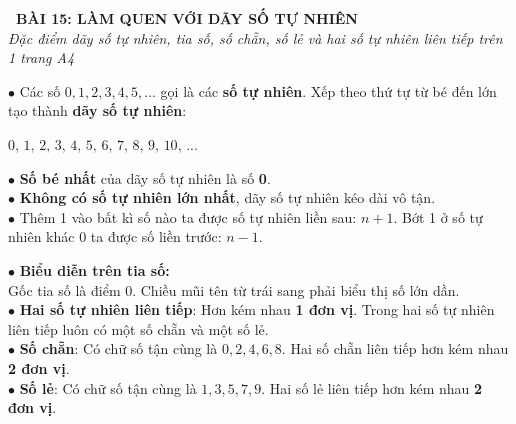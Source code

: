 \documentclass[14pt,a4paper,oneside]{extbook}
\begin{document}
\noindent
\begin{tcolorbox}[
  enhanced,
  colback=teal!8!white,
  colframe=teal!80!black,
  arc=3mm, boxrule=1pt,
  left=3mm, right=3mm, top=2mm, bottom=2mm,
  halign=center
]
  {\Large\bfseries\color{teal!90!black}\faBookmark\ BÀI 15: LÀM QUEN VỚI DÃY SỐ TỰ NHIÊN}\\[1.5pt]
  {\footnotesize\itshape\color{black!75} Đặc điểm dãy số tự nhiên, tia số, số chẵn, số lẻ và hai số tự nhiên liên tiếp trên 1 trang A4}
\end{tcolorbox}

\vspace{2mm}

\noindent
\begin{minipage}[t]{0.49\textwidth}
  \begin{tcolorbox}[
    enhanced,
    title={\footnotesize\bfseries\color{white}\faListUl\ 1. Dãy số tự nhiên \& Đặc điểm},
    colback=blue!2!white,
    colframe=blue!75!black,
    arc=2.5mm, boxrule=0.8pt, top=1.8mm, bottom=1.8mm, left=2mm, right=2mm
  ]
    \footnotesize
    $\bullet$ Các số $0, 1, 2, 3, 4, 5, ...$ gọi là các \textbf{số tự nhiên}. Xếp theo thứ tự từ bé đến lớn tạo thành \textbf{dãy số tự nhiên}:
    \begin{center}
      $0,\, 1,\, 2,\, 3,\, 4,\, 5,\, 6,\, 7,\, 8,\, 9,\, 10,\, ...$
    \end{center}
    $\bullet$ \textbf{Số bé nhất} của dãy số tự nhiên là số \textbf{0}.\\
    $\bullet$ \textbf{Không có số tự nhiên lớn nhất}, dãy số tự nhiên kéo dài vô tận.\\
    $\bullet$ Thêm 1 vào bất kì số nào ta được số tự nhiên liền sau: $n + 1$. Bớt 1 ở số tự nhiên khác 0 ta được số liền trước: $n - 1$.
  \end{tcolorbox}
\end{minipage}%
\hfill
\begin{minipage}[t]{0.49\textwidth}
  \begin{tcolorbox}[
    enhanced,
    title={\footnotesize\bfseries\color{white}\faArrowsH\ 2. Tia số, Số chẵn \& Số lẻ},
    colback=teal!2!white,
    colframe=teal!75!black,
    arc=2.5mm, boxrule=0.8pt, top=1.8mm, bottom=1.8mm, left=2mm, right=2mm
  ]
    \footnotesize
    $\bullet$ \textbf{Biểu diễn trên tia số:}\\
    Gốc tia số là điểm 0. Chiều mũi tên từ trái sang phải biểu thị số lớn dần.\\
    $\bullet$ \textbf{Hai số tự nhiên liên tiếp}: Hơn kém nhau \textbf{1 đơn vị}. Trong hai số tự nhiên liên tiếp luôn có một số chẵn và một số lẻ.\\
    $\bullet$ \textbf{Số chẵn}: Có chữ số tận cùng là $0, 2, 4, 6, 8$. Hai số chẵn liên tiếp hơn kém nhau \textbf{2 đơn vị}.\\
    $\bullet$ \textbf{Số lẻ}: Có chữ số tận cùng là $1, 3, 5, 7, 9$. Hai số lẻ liên tiếp hơn kém nhau \textbf{2 đơn vị}.
  \end{tcolorbox}
\end{minipage}
\end{document}
